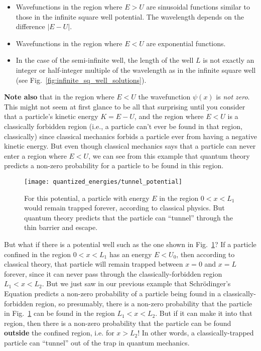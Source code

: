 \begin{itemize}
\item Wavefunctions in the region where $E > U$ are sinusoidal
  functions similar to those in the infinite square well potential.
  The wavelength depends on the difference $\left|E - U\right|$.
\item Wavefunctions in the region where $E < U$ are exponential functions.
\item In the case of the semi-infinite well, the length of the well $L$
is not exactly an integer or half-integer multiple of the wavelength as in
the infinite square well (see Fig.~\ref{fig:infinite_sq_well_solutions}).
\end{itemize}

{\bf Note also} that in the region where $E < U$ the wavefunction $\psi(x)$
is {\it not zero}. This might not seem at first glance to be all that
surprising until you consider that a particle's kinetic energy $K = E - U$,
and the region where $E < U$ is a classically forbidden region (i.e., a
particle can't ever be found in that region, classically) since classical
mechanics forbids a particle ever from having a negative kinetic energy.
But even though classical mechanics says that a particle can never enter a
region where $E < U$, we can see from this example that quantum theory
predicts a non-zero probability for a particle to be found in this region.

\begin{figure}
\begin{center}
\texttt{[image: quantized\_energies/tunnel\_potential]}
\end{center}
\caption{For this potential, a particle with energy $E$ in the region
$0 < x < L_1$ would remain trapped forever, according to classical
physics. But quantum theory predicts that the particle can ``tunnel''
through the thin barrier and escape.}
\label{fig:tunneling}
\end{figure}

But what if there is a potential well such as the one shown in
Fig.~\ref{fig:tunneling}? If a particle confined in the region 
$0 < x < L_1$ has an energy $E < U_0$, then according to classical
theory, that particle will remain trapped between $x = 0$ and
$x = L$ forever, since it can never pass through the classically-forbidden
region $L_1 < x < L_2$. But we just saw in our previous example that
Schr\"{o}dinger's Equation predicts a non-zero probability of a particle
being found in a classically-forbidden region, so presumably, there is
a non-zero probability that the particle in Fig.~\ref{fig:tunneling}
can be found in the region $L_1 < x < L_2$. But if it can make it into
that region, then there is a non-zero probability that the particle
can be found {\bf outside} the confined region, i.e. for $x > L_2$!
In other words, a classically-trapped particle can ``tunnel'' out of
the trap in quantum mechanics.

